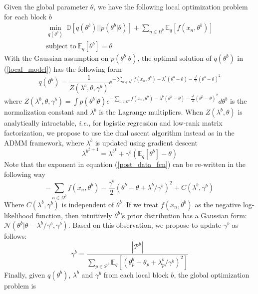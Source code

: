 \documentclass{article}
\newcommand{\ie}[0]{\emph{i.e., }}
\newcommand{\1}[0]{\ensuremath{\boldsymbol{1}}\xspace}
\begin{document}
Given the global parameter $\theta$, we have the following local optimization problem for each block $b$
\begin{equation}\label{local_model}
\begin{gathered}
\min_{q(\theta^b)} ~ \mathbb{D}[q(\theta^b)||p(\theta^b|\theta)] + \sum_{n\in\Omega^b}\mathbb{E}_q[f(x_n, \theta^b)] \\
\mbox{subject to} ~ \mathbb{E}_q[\theta^b] = \theta
\end{gathered}
\end{equation}
With the Gaussian assumption on $p(\theta^b|\theta)$,  the optimal solution of $q(\theta^b)$ in (\ref{local_model}) has the following form
\begin{equation}\label{post_data_fcn}
q(\theta^b) = \frac{1}{Z(\lambda^b, \theta, \gamma^b)}e^{-\sum_{n\in\Omega^b}f(x_n, \theta^b) - \lambda^b(\theta^b-\theta) - \frac{\gamma^b}{2}(\theta^b-\theta)^2}
\end{equation}
where $Z(\lambda^b, \theta, \gamma^b) = \int p(\theta^b|\theta)e^{-\sum_{n\in\Omega^b}f(x_n, \theta^b) - \lambda^b(\theta^b-\theta) - \frac{\gamma^b}{2}(\theta^b-\theta)^2} d\theta^b$ is the normalization constant and $\lambda^b$ is the Lagrange multipliers. When $Z(\lambda^b, \theta)$ is analytically intractable, \ie for logistic regression and low-rank matrix factorization, we propose to use the dual ascent algorithm instead as in the ADMM framework, where $\lambda^b$ is updated using gradient descent
\begin{equation}
{\lambda^b}^{t+1} = {\lambda^b}^t + \gamma^b(\mathbb{E}_q[\theta^b] - \theta)
\end{equation}
Note that the exponent in equation (\ref{post_data_fcn}) can be re-written in the following way
\begin{equation*}
-\sum_{n\in\Omega^b}f(x_n, \theta^b) - \frac{\gamma^b}{2}(\theta^b- \theta + \lambda^b/\gamma^b)^2 + C(\lambda^b, \gamma^b)
\end{equation*}
Where $C(\lambda^b, \gamma^b)$ is independent of $\theta^b$. If we treat $f(x_n, \theta^b)$ as the negative log-likelihood function, then intuitively $\theta^b$'s prior distribution has a Gaussian form: $\mathcal{N}(\theta^b|\theta - \lambda^b/\gamma^b, \gamma^b)$. Based on this observation, we propose to update $\gamma^b$ as follows:
\begin{equation}
\gamma^b = \frac{|\mathcal{P}^b|}{\sum_{p \in \mathcal{P}^b}\mathbb{E}_q[(\theta_p^b-\theta_p+\lambda_p^b/\gamma^b)^2]}
\end{equation}
Finally, given $q(\theta^b)$, $\lambda^b$ and $\gamma^b$ from each local block $b$, the global optimization problem is
\end{document}
